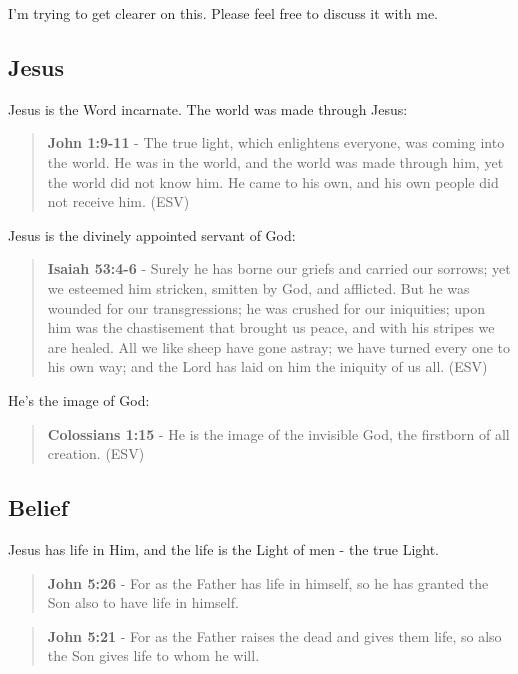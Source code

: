 \documentclass[11pt]{article}
\begin{document}
I'm trying to get clearer on this.
Please feel free to discuss it with me.

\subsection{Jesus}
\label{sec:org7417f2d}
Jesus is the Word incarnate. The world was made through Jesus:

\begin{quote}
\textbf{John 1:9-11} - The true light, which enlightens everyone, was coming into the world. He was in the world, and the world was made through him, yet the world did not know him. He came to his own, and his own people did not receive him. (ESV)
\end{quote}

Jesus is the divinely appointed servant of God:

\begin{quote}
\textbf{Isaiah 53:4-6} - Surely he has borne our griefs and carried our sorrows; yet we esteemed him stricken, smitten by God, and afflicted. But he was wounded for our transgressions; he was crushed for our iniquities; upon him was the chastisement that brought us peace, and with his stripes we are healed. All we like sheep have gone astray; we have turned every one to his own way; and the Lord has laid on him the iniquity of us all. (ESV)
\end{quote}

He's the image of God:

\begin{quote}
\textbf{Colossians 1:15} - He is the image of the invisible God, the firstborn of all creation. (ESV)
\end{quote}

\subsection{Belief}
\label{sec:org875f7a4}
Jesus has life in Him, and the life is the Light of men - the true Light.

\begin{quote}
\textbf{John 5:26} - For as the Father has life in himself, so he has granted the Son also to have life in himself.
\end{quote}

\begin{quote}
\textbf{John 5:21} - For as the Father raises the dead and gives them life, so also the Son gives life to whom he will.
\end{quote}
\end{document}
